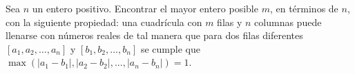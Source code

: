 Sea $n$ un entero positivo. Encontrar el mayor entero posible $m$, en términos de $n$, con la siguiente propiedad: una cuadrícula con $m$ filas y $n$ columnas puede llenarse con números reales de tal manera que para dos filas diferentes $\left[ {{a_1},{a_2},\ldots,{a_n}}\right]$ y $\left[ {{b_1},{b_2},\ldots,{b_n}} \right]$ se cumple que $\max\left( {\left| {{a_1} - {b_1}} \right|,\left| {{a_2} - {b_2}} \right|,...,\left| {{a_n} - {b_n}} \right|} \right) = 1$.